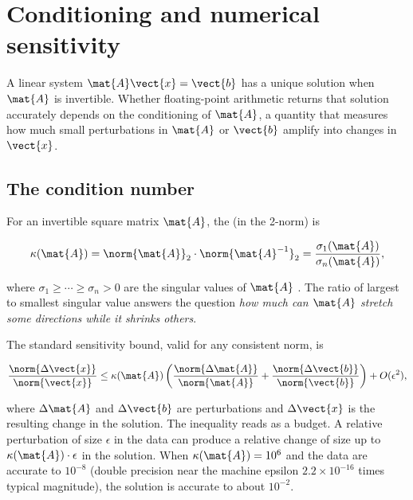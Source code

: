 



\section{Conditioning and numerical sensitivity}

A linear system $\mat{A}\vect{x} = \vect{b}$ has a unique solution
when $\mat{A}$ is invertible. Whether floating-point arithmetic
returns that solution accurately depends on the conditioning of
$\mat{A}$, a quantity that measures how much small perturbations
in $\mat{A}$ or $\vect{b}$ amplify into changes in $\vect{x}$.

\subsection{The condition number}

For an invertible square matrix $\mat{A}$, the  (in the 2-norm) is

\[
\kappa(\mat{A}) = \norm{\mat{A}}_{2} \cdot \norm{\mat{A}^{-1}}_{2}
= \frac{\sigma_{1}(\mat{A})}{\sigma_{n}(\mat{A})},
\]

where $\sigma_{1} \geq \cdots \geq \sigma_{n} > 0$ are the singular
values of $\mat{A}$ \cite[ch.~12]{text:trefethen-bau1997}. The
ratio of largest to smallest singular value answers the question
\emph{how much can $\mat{A}$ stretch some directions while it
shrinks others}.

The standard sensitivity bound, valid for any consistent norm, is

\[
\frac{\norm{\Delta\vect{x}}}{\norm{\vect{x}}} \leq \kappa(\mat{A})
\left(\frac{\norm{\Delta\mat{A}}}{\norm{\mat{A}}}
+ \frac{\norm{\Delta\vect{b}}}{\norm{\vect{b}}}\right) + O(\epsilon^{2}),
\]

where $\Delta\mat{A}$ and $\Delta\vect{b}$ are perturbations and
$\Delta\vect{x}$ is the resulting change in the solution. The
inequality reads as a budget. A relative perturbation of size
$\epsilon$ in the data can produce a relative change of size up to
$\kappa(\mat{A}) \cdot \epsilon$ in the solution. When
$\kappa(\mat{A}) = 10^{6}$ and the data are accurate to $10^{-8}$
(double precision near the machine epsilon $2.2 \times 10^{-16}$
times typical magnitude), the solution is accurate to about
$10^{-2}$.

